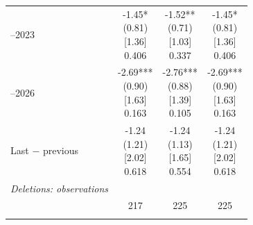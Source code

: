 \begin{threeparttable}
\begin{tabular}{@{}lccc}
\addlinespace[0.25ex]
\addlinespace[0.25ex]
2021–2023 & \makecell{-1.45*\\(0.81)\\{}[1.36]\\{0.406}} & \makecell{-1.52**\\(0.71)\\{}[1.03]\\{0.337}} & \makecell{-1.45*\\(0.81)\\{}[1.36]\\{0.406}} \\
\addlinespace[0.25ex]
\addlinespace[0.25ex]
2024–2026 & \makecell{-2.69***\\(0.90)\\{}[1.63]\\{0.163}} & \makecell{-2.76***\\(0.88)\\{}[1.39]\\{0.105}} & \makecell{-2.69***\\(0.90)\\{}[1.63]\\{0.163}} \\
\addlinespace[0.25ex]
\addlinespace[0.25ex]
Last $-$ previous & \makecell{-1.24\\(1.21)\\{}[2.02]\\{0.618}} & \makecell{-1.24\\(1.13)\\{}[1.65]\\{0.554}} & \makecell{-1.24\\(1.21)\\{}[2.02]\\{0.618}} \\
\addlinespace[0.25ex]
\midrule
\emph{Deletions: observations} \\
\addlinespace[0.25ex]
\addlinespace[1ex]
 & 217 & 225 & 225 \\
\addlinespace[0.25ex]
\bottomrule
\end{tabular}
\endgroup
\noindent\begin{minipage}{\linewidth}\smallskip\footnotesize

\end{minipage}
\end{threeparttable}
